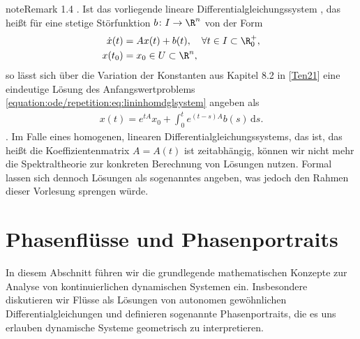 \documentclass[letterpaper,10pt,english]{jupyterBook}
\begin{document}
\begin{sphinxadmonition}{note}{Remark 1.4}
. Ist das vorliegende lineare Differentialgleichungssystem , das heißt für eine stetige Störfunktion \(b \colon I \rightarrow \R^n\) von der Form
\begin{equation}\label{equation:ode/repetition:eq:lininhomdglsystem}
\begin{split}\dot{x}(t) &= A x(t) + b(t), \quad \forall t \in I \subset \R^+_0, \\
x(t_0) &= x_0 \in U \subset \R^n,\end{split}
\end{equation}
\sphinxAtStartPar
so lässt sich über die Variation der Konstanten aus Kapitel 8.2 in {[}\hyperlink{cite.references:id12}{Ten21}{]} eine eindeutige Lösung des Anfangswertproblems \eqref{equation:ode/repetition:eq:lininhomdglsystem} angeben als
\begin{equation*}
\begin{split}x(t) = e^{tA}x_0 + \int_0^t e^{(t-s)A}b(s) \, \mathrm{d}s.\end{split}
\end{equation*}
. Im Falle eines homogenen, linearen Differentialgleichungssystems, das  ist, das heißt die Koeffizientenmatrix \(A = A(t)\) ist zeitabhängig, können wir nicht mehr die Spektraltheorie zur konkreten Berechnung von Lösungen nutzen.
Formal lassen sich dennoch Lösungen als sogenanntes  angeben, was jedoch den Rahmen dieser Vorlesung sprengen würde.
\end{sphinxadmonition}


\section{Phasenflüsse und Phasenportraits}
\label{\detokenize{ode/fluesse:phasenflusse-und-phasenportraits}}\label{\detokenize{ode/fluesse:s-fluesse}}\label{\detokenize{ode/fluesse::doc}}
\sphinxAtStartPar
In diesem Abschnitt führen wir die grundlegende mathematischen Konzepte zur Analyse von kontinuierlichen dynamischen Systemen ein. Insbesondere diskutieren wir Flüsse als Lösungen von autonomen gewöhnlichen Differentialgleichungen und definieren sogenannte Phasenportraits, die es uns erlauben dynamische Systeme geometrisch zu interpretieren.
\end{document}
